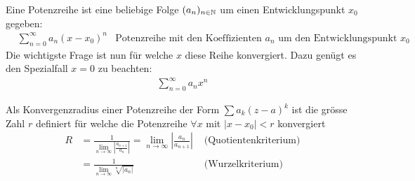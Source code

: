 \documentclass[a4paper]{article}
\begin{document}
			\begin{fdef}[Potenzreihe]
				Eine Potenzreihe ist eine beliebige Folge $(a_n)_{n \in \mathbb{N}}$ um einen Entwicklungspunkt $x_0$ gegeben:
				\begin{align*}
				 	&\sum_{n=0}^\infty a_n ( x -x_0)^n &\text{Potenzreihe mit den Koeffizienten $a_n$ um den Entwicklungspunkt $x_0$}
				\end{align*}
				Die wichtigste Frage ist nun für welche $x$ diese Reihe konvergiert. Dazu genügt es den Spezialfall $x = 0$ zu beachten:
				\begin{align*}
					\sum_{n=0}^\infty a_n x^n
				\end{align*}
			\end{fdef}
			
			\begin{fdef}
				Als Konvergenzradius einer Potenzreihe der Form $\sum a_k (z-a)^k$ ist die grösse Zahl $r$ definiert für welche die Potenzreihe $\forall x$ mit $|x-x_0| < r$ konvergiert
				\begin{align*}
					R &= \frac{1}{\lim_{n \rightarrow \infty} \left| \frac{a_{n+1}}{a_n} \right|} 
					= \lim_{n \rightarrow \infty} \left| \frac{a_{n}}{a_{n+1}} \right| &\text{ (Quotientenkriterium)}\\
					&= \frac{1}{\lim_{n \rightarrow \infty} \sqrt[n]{| a_n |}} &\text{ (Wurzelkriterium) }					
				\end{align*}
			\end{fdef}
\end{document}
